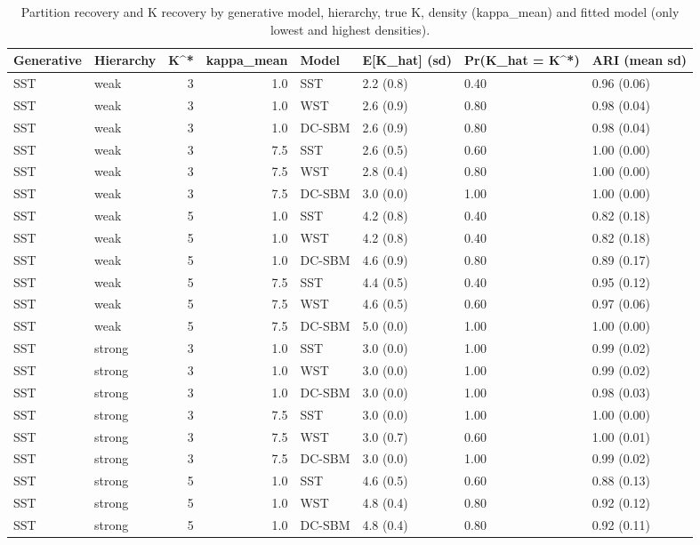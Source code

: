 \begin{table}
\centering
\caption{Partition recovery and K recovery by generative model, hierarchy, true K, density (kappa_mean) and fitted model (only lowest and highest densities).}
\centering
\begin{tabular}[t]{llrrllll}
\toprule
Generative & Hierarchy & K^* & kappa_mean & Model & E[K_hat] (sd) & Pr(K_hat = K^*) & ARI (mean sd)\\
\midrule
SST & weak & 3 & 1.0 & SST & 2.2 (0.8) & 0.40 & 0.96 (0.06)\\
SST & weak & 3 & 1.0 & WST & 2.6 (0.9) & 0.80 & 0.98 (0.04)\\
SST & weak & 3 & 1.0 & DC-SBM & 2.6 (0.9) & 0.80 & 0.98 (0.04)\\
SST & weak & 3 & 7.5 & SST & 2.6 (0.5) & 0.60 & 1.00 (0.00)\\
SST & weak & 3 & 7.5 & WST & 2.8 (0.4) & 0.80 & 1.00 (0.00)\\
\addlinespace
SST & weak & 3 & 7.5 & DC-SBM & 3.0 (0.0) & 1.00 & 1.00 (0.00)\\
SST & weak & 5 & 1.0 & SST & 4.2 (0.8) & 0.40 & 0.82 (0.18)\\
SST & weak & 5 & 1.0 & WST & 4.2 (0.8) & 0.40 & 0.82 (0.18)\\
SST & weak & 5 & 1.0 & DC-SBM & 4.6 (0.9) & 0.80 & 0.89 (0.17)\\
SST & weak & 5 & 7.5 & SST & 4.4 (0.5) & 0.40 & 0.95 (0.12)\\
\addlinespace
SST & weak & 5 & 7.5 & WST & 4.6 (0.5) & 0.60 & 0.97 (0.06)\\
SST & weak & 5 & 7.5 & DC-SBM & 5.0 (0.0) & 1.00 & 1.00 (0.00)\\
SST & strong & 3 & 1.0 & SST & 3.0 (0.0) & 1.00 & 0.99 (0.02)\\
SST & strong & 3 & 1.0 & WST & 3.0 (0.0) & 1.00 & 0.99 (0.02)\\
SST & strong & 3 & 1.0 & DC-SBM & 3.0 (0.0) & 1.00 & 0.98 (0.03)\\
\addlinespace
SST & strong & 3 & 7.5 & SST & 3.0 (0.0) & 1.00 & 1.00 (0.00)\\
SST & strong & 3 & 7.5 & WST & 3.0 (0.7) & 0.60 & 1.00 (0.01)\\
SST & strong & 3 & 7.5 & DC-SBM & 3.0 (0.0) & 1.00 & 0.99 (0.02)\\
SST & strong & 5 & 1.0 & SST & 4.6 (0.5) & 0.60 & 0.88 (0.13)\\
SST & strong & 5 & 1.0 & WST & 4.8 (0.4) & 0.80 & 0.92 (0.12)\\
\addlinespace
SST & strong & 5 & 1.0 & DC-SBM & 4.8 (0.4) & 0.80 & 0.92 (0.11)\\

\end{tabular}
\end{table}
